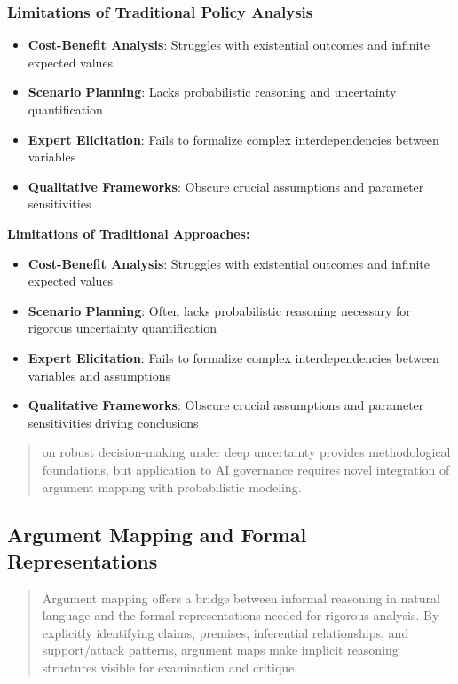 \documentclass[
  11pt,
  letterpaper,
]{book}
\providecommand{\tightlist}{%
  \setlength{\itemsep}{0pt}\setlength{\parskip}{0pt}}
\begin{document}
\subsubsection{Limitations of Traditional Policy
Analysis}\label{sec-traditional-limitations}

\begin{itemize}
\tightlist
\item
  \textbf{Cost-Benefit Analysis}: Struggles with existential outcomes
  and infinite expected values
\item
  \textbf{Scenario Planning}: Lacks probabilistic reasoning and
  uncertainty quantification
\item
  \textbf{Expert Elicitation}: Fails to formalize complex
  interdependencies between variables
\item
  \textbf{Qualitative Frameworks}: Obscure crucial assumptions and
  parameter sensitivities
\end{itemize}

\textbf{Limitations of Traditional Approaches:}

\begin{itemize}
\tightlist
\item
  \textbf{Cost-Benefit Analysis}: Struggles with existential outcomes
  and infinite expected values
\item
  \textbf{Scenario Planning}: Often lacks probabilistic reasoning
  necessary for rigorous uncertainty quantification
\item
  \textbf{Expert Elicitation}: Fails to formalize complex
  interdependencies between variables and assumptions
\item
  \textbf{Qualitative Frameworks}: Obscure crucial assumptions and
  parameter sensitivities driving conclusions
\end{itemize}

\begin{quote}
\textcite{lempert2003} on robust decision-making under deep uncertainty
provides methodological foundations, but application to AI governance
requires novel integration of argument mapping with probabilistic
modeling.
\end{quote}

\subsection{Argument Mapping and Formal
Representations}\label{sec-argument-mapping}

\begin{quote}
Argument mapping offers a bridge between informal reasoning in natural
language and the formal representations needed for rigorous analysis. By
explicitly identifying claims, premises, inferential relationships, and
support/attack patterns, argument maps make implicit reasoning
structures visible for examination and critique.
\end{quote}
\end{document}
